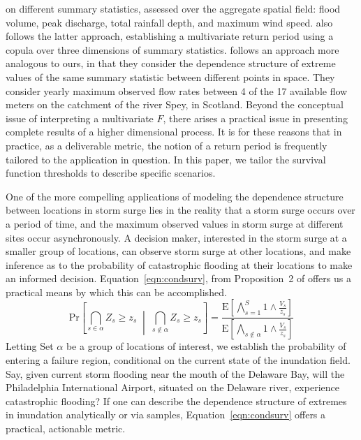     on different summary statistics, assessed over the aggregate spatial field: flood volume, 
    peak discharge, total rainfall depth, and maximum wind speed.  \cite{graler2013} also follows the latter 
    approach, establishing a multivariate return period using a copula over three dimensions of summary statistics.
    \cite{salvadori2010} follows an approach more analogous to ours, in that they consider the dependence 
    structure of extreme values of the same summary statistic between different points in space.  They
    consider yearly maximum observed flow rates between 4 of the 17 available flow meters on the catchment 
    of the river Spey, in Scotland.  
    Beyond the conceptual issue of interpreting a multivariate $F$, there arises a practical issue in presenting
    complete results of a higher dimensional process.
    It is for these reasons that in practice, as a deliverable metric, the notion of a return period is
    frequently tailored to the application in question.  In this paper, we tailor the survival function
    thresholds to describe specific scenarios.

One of the more compelling applications of modeling the dependence structure between locations in 
    storm surge lies in the reality that a storm surge occurs over a period of time, and the 
    maximum observed values in storm surge at different sites occur asynchronously.  A decision maker,
    interested in the storm surge at a smaller group of locations, can observe storm surge at other
    locations, and make inference as to the probability of catastrophic flooding at their locations
    to make an informed decision.
    Equation~\eqref{eqn:condsurv}, from Proposition~2 of \cite{trubey:pg} offers us a practical means
    by which this can be accomplished.
    \begin{equation}
        \label{eqn:condsurv}
        \text{Pr}\left[\bigcap_{s\in\alpha}Z_s \geq z_s\;\middle|\;\bigcap_{s\not\in\alpha}Z_s \geq z_s\right] =
        \frac{
            \text{E}\left[\bigwedge_{s=1}^S 1\wedge \frac{V_s}{z_s}\right]
        }{
            \text{E}\left[\bigwedge_{s\not\in\alpha} 1\wedge \frac{V_s}{z_s}\right]
        }
    \end{equation}
    Letting Set $\alpha$ be a group of locations of interest, we establish the probability of
    entering a failure region, conditional on the current state of the inundation field.  
    Say, given current storm flooding near the mouth of the Delaware Bay, will the 
    Philadelphia International Airport, situated on the Delaware river, experience catastrophic flooding?  
    If one can describe the dependence structure of extremes in inundation analytically or via samples,
    Equation~\ref{eqn:condsurv} offers a practical, actionable metric.

